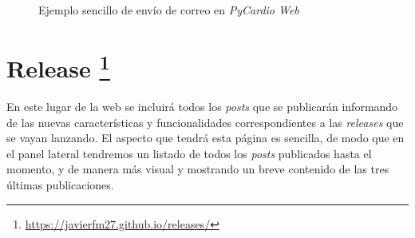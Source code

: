 \begin{figure}[H]
    \centering
    \caption{Ejemplo sencillo de envío de correo en \textit{PyCardio Web}}
    \label{fig:sendEmail}
\end{figure}

\section[Release]{Release \footnote{\url{https://javierfm27.github.io/releases/}}}
\label{sec:releaseWeb}

En este lugar de la web se incluirá todos los \textit{posts} que se publicarán informando de las nuevas características y funcionalidades correspondientes a las \textit{releases} que se vayan lanzando. El aspecto que tendrá esta página es sencilla, de modo que en el panel lateral tendremos un listado de todos los \textit{posts} publicados hasta el momento, y de manera más visual y mostrando un breve contenido de las tres últimas publicaciones. 

